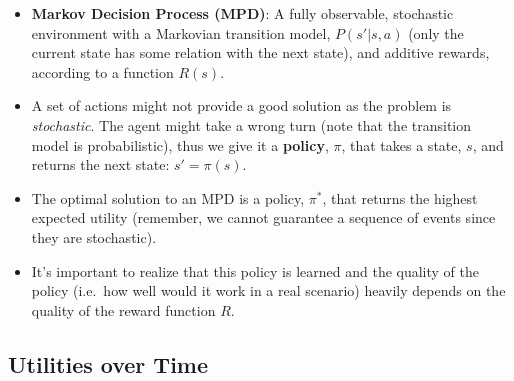 \documentclass[
]{book}
\begin{document}
\begin{itemize}
\item
  \textbf{Markov Decision Process (MPD)}: A fully observable, stochastic
  environment with a Markovian transition model, \(P(s' | s, a)\) (only
  the current state has some relation with the next state), and additive
  rewards, according to a function \(R(s)\).
\item
  A set of actions might not provide a good solution as the problem is
  \emph{stochastic}. The agent might take a wrong turn (note that the
  transition model is probabilistic), thus we give it a \textbf{policy},
  \(\pi\), that takes a state, \(s\), and returns the next state:
  \(s' = \pi(s)\).
\item
  The optimal solution to an MPD is a policy, \(\pi^*\), that returns
  the highest expected utility (remember, we cannot guarantee a sequence
  of events since they are stochastic).
\item
  It's important to realize that this policy is learned and the quality
  of the policy (i.e.~how well would it work in a real scenario) heavily
  depends on the quality of the reward function \(R\).
\end{itemize}

\hypertarget{utilities-over-time}{%
\subsection{Utilities over Time}\label{utilities-over-time}}
\end{document}
